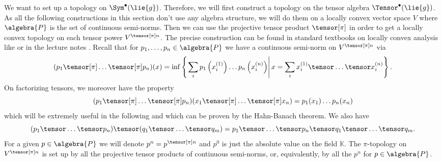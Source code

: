 We want to set up a topology on $\Sym^{\bullet}(\lie{g})$. Therefore, 
we will first construct a topology on the tensor algebra $\Tensor^{\bullet}
(\lie{g})$. As all the following constructions in this section don't use any 
algebra structure, we will do them on a locally convex vector space $V$ where 
$\algebra{P}$ is the set of continuous semi-norms. Then we can use the 
projective tensor product $\tensor[\pi]$ in order to get a locally convex 
topology on each tensor power $V^{\tensor[\pi] n}$. The precise construction 
can be found in standard textbooks on locally convex analysis like 
\cite{Jarchow:LCSpaces} or in the lecture notes \cite{Waldmann:LectureAlgDyn}. 
Recall that for $p_1, \ldots, p_n \in \algebra{P}$ we have a continuous 
semi-norm on $V^{\tensor[\pi] n}$ via
\begin{equation*}
	(p_1 \tensor[\pi] \ldots \tensor[\pi] p_n)(x)
	=
	\inf
	\left\{
	\left.
		\sum_i
		p_1 \left( x_i^{(1)} \right)
		\ldots
		p_n \left( x_i^{(n)} \right)
	\right|
		x
		=
		\sum_i
		x_i^{(1)}
		\tensor \ldots \tensor
		x_i^{(n)}
	\right\}.
\end{equation*}
On factorizing tensors, we moreover have the property
\begin{equation}
	\label{LCAna:FactorTensor}
	(p_1 \tensor[\pi] \ldots \tensor[\pi] p_n)
	(x_1 \tensor[\pi] \ldots \tensor[\pi] x_n)
	=
	p_1(x_1) \ldots p_n(x_n)
\end{equation}
which will be extremely useful in the following and which can be proven by
the Hahn-Banach theorem. We also have 
\begin{equation*}
	(p_1 \tensor \ldots \tensor p_n) 
	\tensor 
	(q_1 \tensor \ldots \tensor q_m) 
	= 
	p_1 \tensor \ldots \tensor p_n \tensor q_1 \tensor \ldots \tensor q_m.
\end{equation*}
For a given $p \in \algebra{P}$ we will denote $p^n = p^{\tensor[\pi] n}$ and 
$p^0$ is just the absolute value on the field $\mathbb{K}$. The $\pi$-topology 
on $V^{\tensor[\pi] n}$ is set up by all the projective tensor products of 
continuous semi-norms, or, equivalently, by all the $p^n$ for $p \in 
\algebra{P}$.

